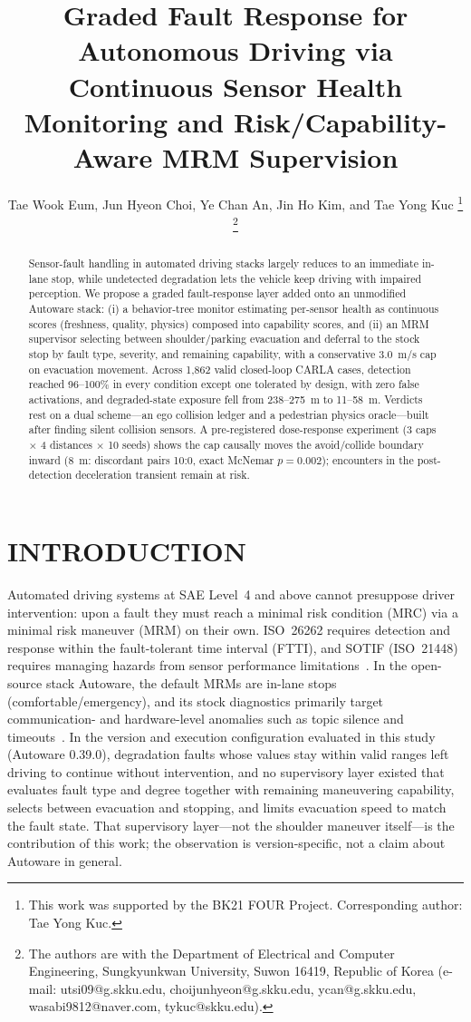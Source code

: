 \documentclass[letterpaper, 10pt, conference]{ieeeconf}
\title{\LARGE \bf
Graded Fault Response for Autonomous Driving via Continuous Sensor Health
Monitoring and Risk/Capability-Aware MRM Supervision}
\author{Tae Wook Eum, Jun Hyeon Choi, Ye Chan An, Jin Ho Kim, and Tae Yong Kuc%
\thanks{This work was supported by the BK21 FOUR Project. Corresponding author: Tae Yong Kuc.}%
\thanks{The authors are with the Department of Electrical and Computer
Engineering, Sungkyunkwan University, Suwon 16419, Republic of Korea
(e-mail: utsi09@g.skku.edu, choijunhyeon@g.skku.edu, ycan@g.skku.edu,
wasabi9812@naver.com, tykuc@skku.edu).}%
}
\begin{document}
\maketitle
\thispagestyle{empty}
\pagestyle{empty}

\begin{abstract}
Sensor-fault handling in automated driving stacks largely reduces to an
immediate in-lane stop, while undetected degradation lets the vehicle keep
driving with impaired perception. We propose a graded fault-response layer
added onto an unmodified Autoware stack: (i) a behavior-tree monitor
estimating per-sensor health as continuous scores (freshness, quality,
physics) composed into capability scores, and (ii) an MRM
supervisor selecting between shoulder/parking evacuation and deferral to
the stock stop by fault type, severity, and remaining capability, with a
conservative 3.0~m/s cap on evacuation movement. Across 1{,}862 valid
closed-loop CARLA cases, detection reached 96--100\% in every condition
except one tolerated by design, with zero false activations, and
degraded-state exposure fell from 238--275~m to 11--58~m. Verdicts rest on a dual
scheme---an ego collision ledger and a pedestrian physics oracle---built
after finding silent collision sensors. A
pre-registered dose-response experiment (3 caps $\times$ 4 distances
$\times$ 10 seeds) shows the cap causally moves the avoid/collide boundary
inward (8~m: discordant pairs 10:0, exact McNemar $p=0.002$); encounters in
the post-detection deceleration transient remain at risk.
\end{abstract}

\section{INTRODUCTION}

Automated driving systems at SAE Level~4 and above cannot presuppose
driver intervention: upon a fault they must reach a minimal risk condition
(MRC) via a minimal risk maneuver (MRM) on their own. ISO~26262 requires
detection and response within the fault-tolerant time interval (FTTI), and
SOTIF (ISO~21448) requires managing hazards from sensor performance
limitations~\cite{iso26262,iso21448,j3016}. In the open-source stack
Autoware, the default MRMs are in-lane stops (comfortable/emergency), and its
stock diagnostics primarily target communication- and hardware-level
anomalies such as topic silence and timeouts~\cite{autoware}. In the version
and execution configuration evaluated in this study (Autoware 0.39.0),
degradation faults whose values stay within valid ranges left driving to
continue without intervention, and no supervisory layer existed that
evaluates fault type and degree together with remaining maneuvering
capability, selects between evacuation and stopping, and limits evacuation
speed to match the fault state. That supervisory layer---not the shoulder
maneuver itself---is the contribution of this work; the observation is
version-specific, not a claim about Autoware in general.
\end{document}
